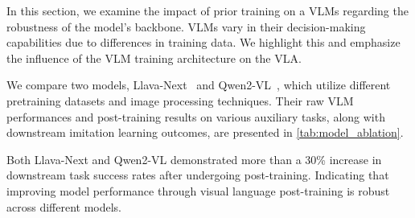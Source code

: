 In this section, we examine the impact of prior training on a VLMs regarding the robustness of the model's backbone. VLMs vary in their decision-making capabilities due to differences in training data. We highlight this and emphasize the influence of the VLM training architecture on the VLA.

We compare two models, Llava-Next~\citep{llavanext} and Qwen2-VL~\citep{qwen2vl}, which utilize different pretraining datasets and image processing techniques. Their raw VLM performances and post-training results on various auxiliary tasks, along with downstream imitation learning outcomes, are presented in \autoref{tab:model_ablation}.

Both Llava-Next and Qwen2-VL demonstrated more than a 30\% increase in downstream task success rates after undergoing \method post-training. Indicating that improving model performance through visual language post-training is robust across different models.

